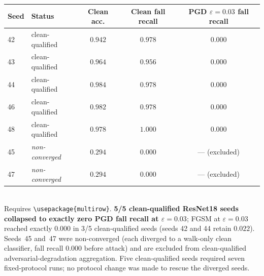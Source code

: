 \begin{table}[t]
  \vspace{0.6em}

  \begin{tabular}{l l c c c}
    \toprule
    Seed & Status & Clean acc. & Clean fall recall & PGD $\varepsilon{=}0.03$ fall recall \\
    \midrule
    42 & clean-qualified & $0.942$ & $0.978$ & $0.000$ \\
    43 & clean-qualified & $0.964$ & $0.956$ & $0.000$ \\
    44 & clean-qualified & $0.984$ & $0.978$ & $0.000$ \\
    46 & clean-qualified & $0.982$ & $0.978$ & $0.000$ \\
    48 & clean-qualified & $0.978$ & $1.000$ & $0.000$ \\
    45 & \emph{non-converged} & $0.294$ & $0.000$ & --- (excluded) \\
    47 & \emph{non-converged} & $0.294$ & $0.000$ & --- (excluded) \\
    \bottomrule
  \end{tabular}
  \\[0.3em]
  {\footnotesize Requires \texttt{\textbackslash usepackage\{multirow\}}.
  \textbf{5/5 clean-qualified ResNet18 seeds collapsed to exactly zero PGD fall
  recall at $\varepsilon=0.03$}; FGSM at $\varepsilon=0.03$ reached exactly $0.000$
  in 3/5 clean-qualified seeds (seeds 42 and 44 retain $0.022$). Seeds~45 and~47
  were non-converged (each diverged to a walk-only clean classifier, fall recall
  $0.000$ before attack) and are excluded from clean-qualified
  adversarial-degradation aggregation. Five clean-qualified seeds required seven
  fixed-protocol runs; no protocol change was made to rescue the diverged seeds.}
\end{table}
